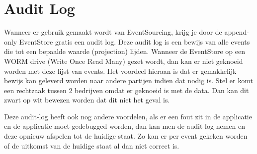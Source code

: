 
\section{Audit Log}
\label{sec:audit-log}

Wanneer er gebruik gemaakt wordt van EventSourcing, krijg je door de append-only EventStore gratis een audit log. Deze audit log is een bewijs van alle events die tot een bepaalde waarde (projection) lijden. Wanneer de EventStore op een WORM drive (Write Once Read Many) gezet wordt, dan kan er niet geknoeid worden met deze lijst van events. Het voordeel hieraan is dat er gemakkelijk bewijs kan geleverd worden naar andere partijen indien dat nodig is. Stel er komt een rechtzaak tussen 2 bedrijven omdat er geknoeid is met de data. Dan kan dit zwart op wit bewezen worden dat dit niet het geval is.

Deze audit-log heeft ook nog andere voordelen, als er een fout zit in de applicatie en de applicatie moet gedebugged worden, dan kan men de audit log nemen en deze opnieuw afspelen tot de huidige staat. Zo kan er per event gekeken worden of de uitkomst van de huidige staat al dan niet correct is.